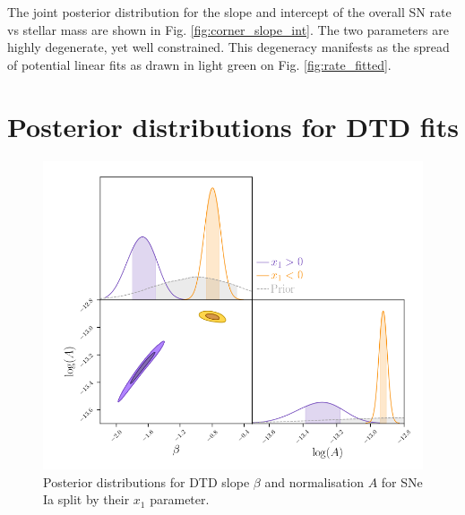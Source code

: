 \documentclass[fleqn,usenatbib]{mnras}
\begin{document}
The joint posterior distribution for the slope and intercept of the overall SN rate vs stellar mass are shown in Fig. \ref{fig:corner_slope_int}. The two parameters are highly degenerate, yet well constrained. This degeneracy manifests as the spread of potential linear fits as drawn in light green on Fig. \ref{fig:rate_fitted}.

\section{Posterior distributions for DTD fits}
\label{appendix:posteriors}


\begin{figure}
    \centering
    \includegraphics[width=.5\textwidth]{figs/fit_dtd_split_x1_A_beta_corner.png}
    \caption{Posterior distributions for DTD slope $\beta$ and normalisation $A$ for SNe Ia split by their $x_1$ parameter.%
    \label{fig:corner_beta_norm_split_x1}}
\end{figure}
\end{document}
